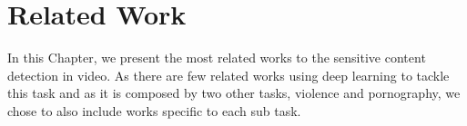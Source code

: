 \newpage

\chapter{Related Work}
\label{chap:related}

In this Chapter, we present the most related works to the sensitive content detection in video. As there are few related works using deep learning to tackle this task and as it is composed by two other tasks, violence and pornography, we chose to also include works specific to each sub task.

 

